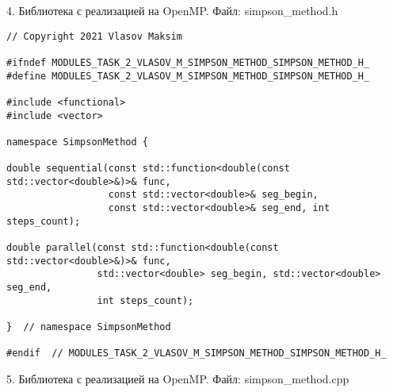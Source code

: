\documentclass{report}
\begin{document}
\par 4. Библиотека с реализацией на OpenMP. Файл: simpson\_method.h

\begin{lstlisting}
// Copyright 2021 Vlasov Maksim

#ifndef MODULES_TASK_2_VLASOV_M_SIMPSON_METHOD_SIMPSON_METHOD_H_
#define MODULES_TASK_2_VLASOV_M_SIMPSON_METHOD_SIMPSON_METHOD_H_

#include <functional>
#include <vector>

namespace SimpsonMethod {

double sequential(const std::function<double(const std::vector<double>&)>& func,
                  const std::vector<double>& seg_begin,
                  const std::vector<double>& seg_end, int steps_count);

double parallel(const std::function<double(const std::vector<double>&)>& func,
                std::vector<double> seg_begin, std::vector<double> seg_end,
                int steps_count);

}  // namespace SimpsonMethod

#endif  // MODULES_TASK_2_VLASOV_M_SIMPSON_METHOD_SIMPSON_METHOD_H_
\end{lstlisting}

\par 5. Библиотека с реализацией на OpenMP. Файл: simpson\_method.cpp
\end{document}
